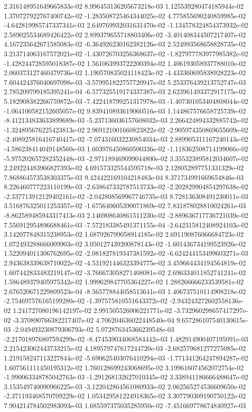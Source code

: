 2.316148951649665833e-02
8.996453136205673218e-03
1.125539280474185944e-02
1.370727922767400742e-02
-1.283508725464344025e-02
4.775855690240859985e-02
-4.642819985747337341e-03
2.649769932031631470e-02
-1.134578324854373932e-02
2.589025534689426422e-02
2.899379655718803406e-02
-3.401408344507217407e-02
4.167235642671585083e-02
-6.364926230162382126e-03
2.524993568658828735e-02
3.213714063167572021e-02
-1.430726703256368637e-02
-1.827977783977985382e-02
-1.428244728595018387e-02
1.561063993722200394e-02
1.406193058937788010e-02
2.060373127460479736e-02
1.190570835024118423e-02
-4.433360695838928223e-02
7.604424376040697098e-03
-3.579951822757720947e-02
5.253376439213752747e-03
2.785209799185395241e-04
-6.577325519174337387e-03
2.623961493372917175e-02
5.182908382266759872e-03
-7.422418799251317978e-03
-1.407301053404808044e-02
-1.064100582152605057e-02
9.839410893619060516e-03
1.144867576658725739e-02
-8.412134833633899689e-03
-5.237136036157608032e-03
2.266424894332885742e-02
-1.324895676225423813e-02
2.969121001660823822e-02
-2.905974350869655609e-02
-2.408925816416740417e-02
-7.074316032230854034e-03
2.889905311167240143e-02
-4.586238414049148560e-03
1.603976450860500336e-02
-1.118362508714199066e-02
-5.975202657282352448e-03
-2.971189469099044800e-02
3.355323895812034607e-02
2.249224483966827393e-02
4.691573325544595718e-03
2.128052897751331329e-02
7.868864573538303375e-03
9.424422169104218483e-04
8.371734991669654846e-03
8.226460777223110199e-03
-2.638647332787513733e-02
-2.202829904854297638e-02
-2.337713912129402161e-02
-2.042808569967746735e-03
8.728136308491230011e-03
3.516876325011253357e-02
-1.675640605390071869e-02
7.831878028810024261e-03
-8.862589485943317413e-03
2.146908640861511230e-02
-2.889636717736721039e-02
7.556912954896688461e-03
-7.572183385491371155e-04
-2.642315812408924103e-02
3.142077848315238953e-02
1.687926799058914185e-02
2.691190876066684723e-02
1.072493288666009903e-02
3.050127439200878143e-02
-1.601436734199523926e-02
1.522094011306762695e-02
-2.081827819347381592e-02
-6.624244153499603271e-03
2.943638339638710022e-02
-4.531921446323394775e-02
3.459664434194564819e-02
1.607442833483219147e-02
-3.766673058271408081e-02
2.696334011852741241e-02
1.586489379405975342e-02
1.999629847705364227e-02
1.288266666233539581e-02
2.676520671229809523e-04
-8.565778844058513641e-03
1.406737510114908218e-02
-2.754697576165199280e-02
-1.397575810551643372e-02
-2.943243272602558136e-02
1.241727080196142197e-02
2.991505526006221771e-02
-3.732960298657417297e-02
-3.370890766382217407e-02
4.706204636022448540e-04
9.657286107540130615e-03
-2.049493230879306793e-02
5.072876345366239548e-03
-2.217018976807594299e-02
-8.474539034068584442e-03
1.482914900407195091e-03
2.215423062443733215e-02
4.189579747617244720e-03
-2.682579681277275085e-02
1.219158247113227844e-02
-5.690625403076410294e-03
-1.771341264247894287e-02
1.607561111450195312e-02
1.760128699243068695e-02
3.199616074562072754e-02
-1.990063348785042763e-03
-1.291268132627010345e-02
3.338941186666488647e-02
3.153549740090966225e-03
-3.122042864561080933e-02
2.062565274536609650e-02
-2.371193468570709229e-02
1.053429581224918365e-02
3.307790309190750122e-02
7.904214784502983093e-03
1.685597375035285950e-02
-7.451669778674840927e-03
